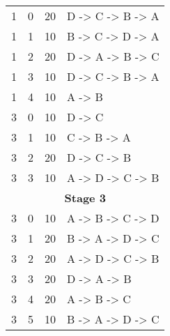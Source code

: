 \begin{table}[htbp]
\begin{tabular}{cccl}
        1 & 0 & 20 & D -> C -> B -> A \\
        1 & 1 & 10 & B -> C -> D -> A \\
        1 & 2 & 20 & D -> A -> B -> C \\
        1 & 3 & 10 & D -> C -> B -> A \\
        1 & 4 & 10 & A -> B \\
        3 & 0 & 10 & D -> C \\
        3 & 1 & 10 & C -> B -> A \\
        3 & 2 & 20 & D -> C -> B \\
        3 & 3 & 10 & A -> D -> C -> B \\
        \hline
        \multicolumn{4}{c}{\textbf{Stage 3}} \\
        \hline
        3 & 0 & 10 & A -> B -> C -> D \\
        3 & 1 & 20 & B -> A -> D -> C \\
        3 & 2 & 20 & A -> D -> C -> B \\
        3 & 3 & 20 & D -> A -> B \\
        3 & 4 & 20 & A -> B -> C \\
        3 & 5 & 10 & B -> A -> D -> C \\
        \hline
    \end{tabular}
\end{table}